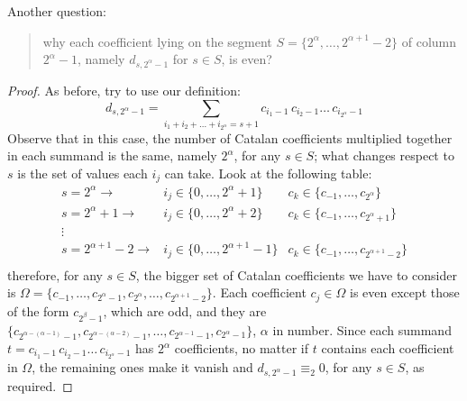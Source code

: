\documentclass[11pt,a4paper]{article} %
\begin{document}
    Another question: 
    \begin{quote}
        why each coefficient lying on the segment 
        $S=\lbrace2^{\alpha},\ldots,2^{\alpha+1}-2\rbrace$ of column 
        $2^{\alpha}-1$, namely $d_{s,2^{\alpha}-1}$ for $s\in S$, is even?
    \end{quote}
    \begin{proof}
    As before, try to use our definition:
    \begin{displaymath}
        d_{s, 2^{\alpha}-1} = \sum_{i_{1}+i_{2}+\ldots+i_{2^{\alpha}}=s+1}
            {c_{i_{1}-1}\,c_{i_{2}-1}\ldots\,c_{i_{2^{\alpha}}-1}}
    \end{displaymath}
    Observe that in this case, the number of Catalan coefficients
    multiplied together in each summand is the same, namely $2^{\alpha}$,
    for any $s\in S$; what changes respect to $s$ is the set of values 
    each $i_{j}$ can take. Look at the following table:
    \begin{displaymath}
        \begin{array}{rcc}
            s = 2^{\alpha} \rightarrow
                & i_{j}\in\lbrace0,\ldots,2^{\alpha}+1\rbrace 
                & c_{k}\in\lbrace c_{-1},\ldots,c_{2^{\alpha}}\rbrace\\
            s = 2^{\alpha} +1\rightarrow
                & i_{j}\in\lbrace0,\ldots,2^{\alpha}+2\rbrace 
                & c_{k}\in\lbrace c_{-1},\ldots,c_{2^{\alpha}+1}\rbrace\\
            \vdots & & \\
            s = 2^{\alpha+1} -2\rightarrow
                & i_{j}\in\lbrace0,\ldots,2^{\alpha+1}-1\rbrace 
                & c_{k}\in\lbrace c_{-1},\ldots,c_{2^{\alpha+1}-2}\rbrace\\
        \end{array}
    \end{displaymath}
    therefore, for any $s\in S$, the bigger set of Catalan coefficients we have 
    to consider is $\Omega = \lbrace c_{-1},\ldots,c_{2^{\alpha}-1},c_{2^{\alpha}},\ldots,c_{2^{\alpha+1}-2}\rbrace$.
    Each coefficient $c_{j}\in\Omega$ is even except those of the form $c_{2^{\beta}-1}$, which are odd,
    and they are $\lbrace c_{2^{\alpha-(\alpha-1)}-1},c_{2^{\alpha-(\alpha-2)}-1},\ldots, 
        c_{2^{\alpha-1}-1},c_{2^{\alpha}-1}\rbrace$, $\alpha$ in number.
    Since each summand $t=c_{i_{1}-1}\,c_{i_{2}-1}\ldots\,c_{i_{2^{\alpha}}-1}$ 
    has $2^{\alpha}$ coefficients, no matter if $t$ contains each coefficient in $\Omega$,
    the remaining ones make it vanish and $ d_{s, 2^{\alpha}-1} \equiv_{2} 0$, for any $s\in S$,
    as required.

    \end{proof}
\end{document}
